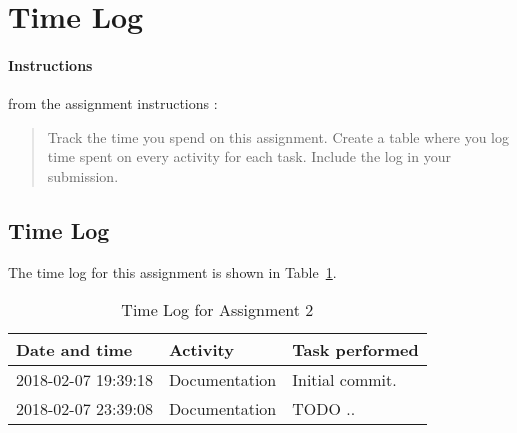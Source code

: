 %
%
%


\section{Time Log}

\paragraph{Instructions}\label{time-log-instructions}
from the assignment instructions \cite{2dv603:assignment1-instructions}:

\begin{quote}
  Track the time you spend on this assignment. Create a table where you log
  time spent on every activity for each task. Include the log in your
  submission.
\end{quote}


\subsection{Time Log}
%
%

The time log for this assignment is shown in Table~\ref{table-timelog}.

\begin{table}[]
  \centering
  \begin{tabular}{@{}l|l|l}
    \toprule
    Date and time       & Activity      & Task performed                            \\
    \midrule
    2018-02-07 19:39:18 & Documentation & Initial commit.                           \\
    2018-02-07 23:39:08 & Documentation & TODO ..                                   \\
    \bottomrule
  \end{tabular}
  \caption{Time Log for Assignment 2}
  \label{table-timelog}
\end{table}
